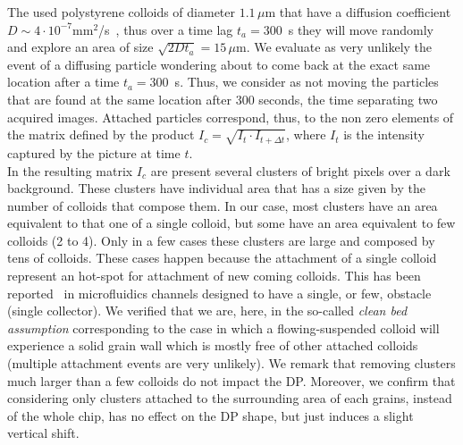 \documentclass[singlecolumn,pre,notitlepage,preprintnumbers,floatfix,superscriptaddress]{revtex4-1}
\begin{document}
\noindent
The used polystyrene colloids of diameter $1.1 \, \mu$m that have a diffusion coefficient $D \sim 4 \cdot 10^{-7}$mm$^2$/s~\cite{bordoloi_structure_2022,hamada_method_2023}, thus over a time lag $t_a = 300$~s they will move randomly and explore an area of size $\sqrt{2Dt_a} = 15 \, \mu$m. We evaluate as very unlikely the event of a diffusing particle wondering about to come back at the exact same location after a time $t_a = 300$~s. Thus, we consider as not moving the particles that are found at the same location after 300 seconds, the time separating two acquired images. Attached particles correspond, thus, to the non zero elements of the matrix defined by the product $I_c = \sqrt{I_t \cdot I_{t+\Delta t}}$, where $I_t$ is the intensity captured by the picture at time $t$.\\

\noindent
In the resulting matrix $I_c$ are present several clusters of bright pixels over a dark background. These clusters have individual area that has a size given by the number of colloids that compose them. In our case, most clusters have an area equivalent to that one of a single colloid, but some have an area equivalent to few colloids (2 to 4). Only in a few cases these clusters are large and composed by tens of colloids. These cases happen because the attachment of a single colloid represent an hot-spot for attachment of new coming colloids. This has been reported~\cite{Herve2015} in microfluidics channels designed to have a single, or few, obstacle (single collector). We verified that we are, here, in the so-called \emph{clean bed assumption} corresponding to the case in which a flowing-suspended colloid will experience a solid grain wall which is mostly free of other attached colloids (multiple attachment events are very unlikely). We remark that removing clusters much larger than a few colloids do not impact the DP. Moreover, we confirm that considering only clusters attached to the surrounding area of each grains, instead of the whole chip, has no effect on the DP shape, but just induces a slight vertical shift. \\
\end{document}
